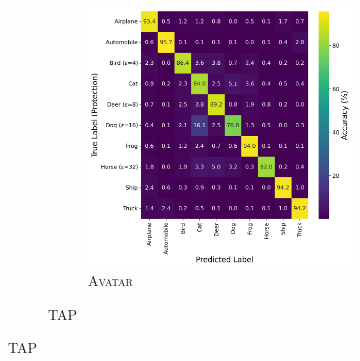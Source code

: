 \documentclass[conference]{IEEEtran}
\theoremstyle{definition}
\theoremstyle{remark}
\theoremstyle{proposition}
\begin{document}
\begin{figure}[tb!]
\begin{subfigure}{1.0\textwidth}
\begin{subfigure}{.40\textwidth}
    		\includegraphics[width=1.0\textwidth]{combination_attacks/ResNet18_ADV_eps_combo_t_200_confusion_matrix.png}
            \caption*{\textsc{Avatar}}
    	\end{subfigure}
	\caption{TAP~\citep{fowl2021tap}}
    \end{subfigure}
\end{figure}
\end{document}
